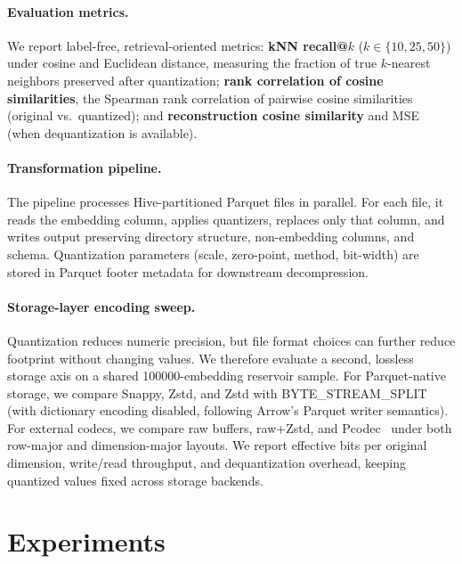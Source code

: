 \documentclass{article}
\begin{document}
\paragraph{Evaluation metrics.}
\label{sec:metrics}

We report label-free, retrieval-oriented metrics:
\textbf{kNN recall@$k$} ($k \in \{10,25,50\}$) under cosine and Euclidean distance, measuring the fraction of true $k$-nearest neighbors preserved after quantization;
\textbf{rank correlation of cosine similarities}, the Spearman rank correlation of pairwise cosine similarities (original vs.\ quantized); and
\textbf{reconstruction cosine similarity} and MSE (when dequantization is available).

\paragraph{Transformation pipeline.}

The pipeline processes Hive-partitioned Parquet files in parallel.
For each file, it reads the embedding column, applies quantizers, replaces only that column, and writes output preserving directory structure, non-embedding columns, and schema.
Quantization parameters (scale, zero-point, method, bit-width) are stored in Parquet footer metadata for downstream decompression.

\paragraph{Storage-layer encoding sweep.}

Quantization reduces numeric precision, but file format choices can further reduce footprint without changing values.
We therefore evaluate a second, lossless storage axis on a shared \num{100000}-embedding reservoir sample.
For Parquet-native storage, we compare Snappy, Zstd, and Zstd with BYTE\_STREAM\_SPLIT (with dictionary encoding disabled, following Arrow's Parquet writer semantics).
For external codecs, we compare raw buffers, raw+Zstd, and Pcodec~\citep{loncaric2025pcodec} under both row-major and dimension-major layouts.
We report effective bits per original dimension, write/read throughput, and dequantization overhead, keeping quantized values fixed across storage backends.

\section{Experiments}
\label{sec:experiments}
\end{document}
